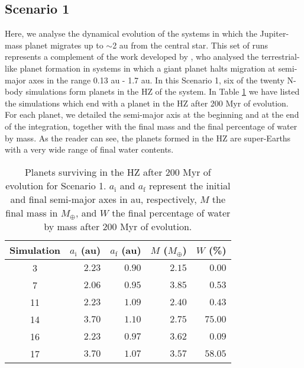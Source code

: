 \documentclass{aa}
\begin{document}
\subsection{Scenario 1}
\label{sect:scenario1}

Here, we analyse the dynamical evolution of the systems in which the Jupiter-mass planet migrates up to $\sim$2 au from the central
star.
This set of runs represents a complement of the work developed by \citet{Fogg2009}, who analysed the terrestrial-like planet
formation in systems in which a giant planet halts migration at semi-major axes in the range 0.13 au - 1.7 au.
In this Scenario 1, six of the twenty N-body simulations form planets in the HZ of the system.
In Table \ref{table:resultados-Scen1} we have listed the simulations which end with a planet in the HZ after 200 Myr of evolution.
For each planet, we detailed the semi-major axis at the beginning and at the end of the integration, together with the final mass and the final percentage of water by mass. As the reader can see, the planets formed in the HZ are super-Earths with a very
wide range of final water contents.

\begin{table}[ht]
\caption{
 Planets surviving in the HZ after 200 Myr of evolution for Scenario 1.
 $a_{\text{i}}$ and $a_{\text{f}}$ represent the initial and final semi-major axes in au, respectively, $M$ the final mass
 in $M_\oplus$, and $W$ the final percentage of water by mass after 200 Myr of evolution.}
 \begin{center}
  \begin{tabular}{|c|r|r|r|r|}
 \hline
 Simulation & $a_{\text{i}}$ (au) & $a_{\text{f}}$ (au) & $M$ ($M_{\oplus}$) & $W$ (\%) \\
 \hline \hline
 3  & $2.23$ & $0.90$ & $2.15$ & $0.00$ \\
 7  & $2.06$ & $0.95$ & $3.85$ & $0.53$ \\
 11 & $2.23$ & $1.09$ & $2.40$ & $0.43$ \\
 14 & $3.70$ & $1.10$ & $2.75$ & $75.00$ \\
 16 & $2.23$ & $0.97$ & $3.62$ & $0.09$ \\
 17 & $3.70$ & $1.07$ & $3.57$ & $58.05$ \\
 \hline
  \end{tabular}
 \label{table:resultados-Scen1}
 \end{center}
\end{table}
\end{document}
